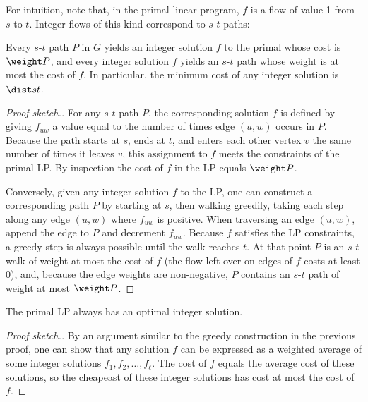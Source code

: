 For intuition, note that, in the primal linear program, $f$ is a flow of value 1 from $s$ to $t$.
Integer flows of this kind correspond to $s$-$t$ paths:
\begin{lemma}\label{flow: lemma: sp primal}
  Every $s$-$t$ path $P$ in $G$ yields an integer solution $f$ to the primal whose cost is $\weight P$,
  and every integer solution $f$ yields an $s$-$t$ path whose weight is at most the cost of $f$.
  In particular, the minimum cost of any integer solution is $\dist s t$.
\end{lemma}
\begin{proof}[Proof sketch.]
  For any $s$-$t$ path $P$, the corresponding solution $f$ is defined by giving $f_{uw}$ a value equal to the number of times edge $(u, w)$ occurs in $P$.  Because the path starts at $s$, ends at $t$, and enters each other vertex $v$ the same number of times it leaves $v$, this assignment to $f$ meets the constraints of the primal LP.
  By inspection the cost of $f$ in the LP equals $\weight P$.

  Conversely, given any integer solution $f$ to the LP, one can construct a corresponding path $P$ by starting at $s$,
  then walking greedily, taking each step along any edge $(u, w)$ where $f_{uw}$ is positive.  When traversing an edge $(u, w)$,
  append the edge to $P$ and decrement $f_{uw}$.  Because $f$ satisfies the LP constraints,
  a greedy step is always possible until the walk reaches $t$.
  At that point $P$ is an $s$-$t$ walk of weight at most the cost of $f$ (the flow left over on edges of $f$ costs at least 0),
  and, because the edge weights are non-negative, $P$ contains an $s$-$t$ path of weight at most $\weight P$.
\end{proof}

\begin{lemma}
  The primal LP always has an optimal integer solution.
\end{lemma}
\begin{proof}[Proof sketch.]
  By an argument similar to the greedy construction in the previous proof, one can show that any solution $f$
  can be expressed as a weighted average of some integer solutions $f_1, f_2, \ldots, f_\ell$.
  The cost of $f$ equals the average cost of these solutions,
  so the cheapeast of these integer solutions has cost at most the cost of $f$.
\end{proof}


